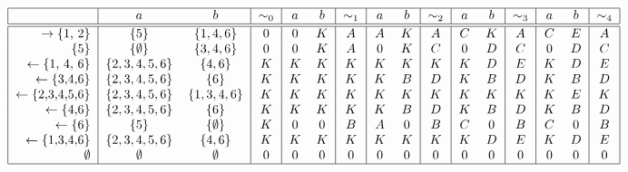 \documentclass[11pt]{article}
\begin{document}
\[
\begin{tabular}{|r|c c|c|c c|c|c c|c|c c|c|c c|c|}
    \hline
    & $a$ & $b$ & $\sim_0$ & $a$ & $b$ & $\sim_1$ & $a$ & $b$ & $\sim_2$ & $a$ & $b$ & $\sim_3$ & $a$ & $b$ & $\sim_4$\\
    \hline
    \hline
    $\rightarrow \{$1, 2$\}$    & $\{5\}$        & $\{1,4,6\}$    & $0$ & $0$ & $K$ & $A$ & $A$ & $K$ & $A$ & $C$ & $K$ & $A$ & $C$ & $E$ & $A$\\
    $\{$5$\}$                   & $\{\emptyset\}$& $\{3,4,6\}$    & $0$ & $0$ & $K$ & $A$ & $0$ & $K$ & $C$ & $0$ & $D$ & $C$ & $0$ & $D$ & $C$\\
    $\leftarrow \{$1, 4, 6$\}$  & $\{2,3,4,5,6\}$& $\{4,6\}$      & $K$ & $K$ & $K$ & $K$ & $K$ & $K$ & $K$ & $K$ & $D$ & $E$ & $K$ & $D$ & $E$\\
    $\leftarrow \{$3,4,6$\}$    & $\{2,3,4,5,6\}$& $\{6\}$        & $K$ & $K$ & $K$ & $K$ & $K$ & $B$ & $D$ & $K$ & $B$ & $D$ & $K$ & $B$ & $D$\\
    $\leftarrow \{$2,3,4,5,6$\}$& $\{2,3,4,5,6\}$& $\{1,3,4,6\}$  & $K$ & $K$ & $K$ & $K$ & $K$ & $K$ & $K$ & $K$ & $K$ & $K$ & $K$ & $E$ & $K$\\
    $\leftarrow \{$4,6$\}$      & $\{2,3,4,5,6\}$& $\{6\}$        & $K$ & $K$ & $K$ & $K$ & $K$ & $B$ & $D$ & $K$ & $B$ & $D$ & $K$ & $B$ & $D$\\
    $\leftarrow \{$6$\}$        & $\{5\}$        & $\{\emptyset\}$& $K$ & $0$ & $0$ & $B$ & $A$ & $0$ & $B$ & $C$ & $0$ & $B$ & $C$ & $0$ & $B$\\
    $\leftarrow\{$1,3,4,6$\}$   & $\{2,3,4,5,6\}$& $\{4,6\}$      & $K$ & $K$ & $K$ & $K$ & $K$ & $K$ & $K$ & $K$ & $D$ & $E$ & $K$ & $D$ & $E$\\
    $\emptyset$                 &$\emptyset$     &$\emptyset$     & $0$ & $0$ & $0$ & $0$ & $0$ & $0$ & $0$ & $0$ & $0$ & $0$ & $0$ & $0$ & $0$\\ 
    \hline
\end{tabular}
\]


 
\end{document}
